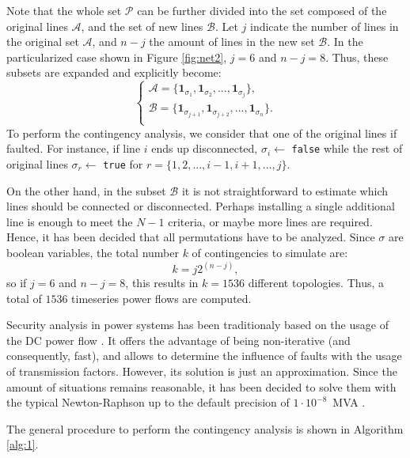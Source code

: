 Note that the whole set $\mathcal{P}$ can be further divided into the set composed of the original lines $\mathcal{A}$, and the set of new lines $\mathcal{B}$. Let $j$ indicate the number of lines in the original set $\mathcal{A}$, and $n-j$ the amount of lines in the new set $\mathcal{B}$. In the particularized case shown in Figure \ref{fig:net2}, $j=6$ and $n-j=8$. Thus, these subsets are expanded and explicitly become:
\begin{equation}
  \begin{cases}
  \mathcal{A} = \{\mathbf{1}_{\sigma_{1}}, \mathbf{1}_{\sigma_{2}},..., \mathbf{1}_{\sigma_{j}}\}, \\
  \mathcal{B} = \{\mathbf{1}_{\sigma_{j+1}}, \mathbf{1}_{\sigma_{j+2}},..., \mathbf{1}_{\sigma_{n}}\}. \\
\end{cases}
\end{equation}
To perform the contingency analysis, we consider that one of the original lines if faulted. For instance, if line $i$ ends up disconnected, $\sigma_i\gets$ \texttt{false} while the rest of original lines $\sigma_r\gets$ \texttt{true} for $r=\{1,2,...,i-1,i+1,...,j\}$.

On the other hand, in the subset $\mathcal{B}$ it is not straightforward to estimate which lines should be connected or disconnected. Perhaps installing a single additional line is enough to meet the $N-1$ criteria, or maybe more lines are required. Hence, it has been decided that all permutations have to be analyzed. Since $\sigma$ are boolean variables, the total number $k$ of contingencies to simulate are:
\begin{equation}
  k = j 2^{(n-j)},
\end{equation}
so if $j=6$ and $n-j=8$, this results in $k=1536$ different topologies. Thus, a total of $1536$ timeseries power flows are computed. 

Security analysis in power systems has been traditionaly based on the usage of the DC power flow \cite{stott2009dc, capitanescu2011state}. It offers the advantage of being non-iterative (and consequently, fast), and allows to determine the influence of faults with the usage of transmission factors. However, its solution is just an approximation. Since the amount of situations remains reasonable, it has been decided to solve them with the typical Newton-Raphson up to the default precision of $1\cdot 10^{-8}$~MVA \cite{pandapower2018}. 

The general procedure to perform the contingency analysis is shown in Algorithm \ref{alg:1}.

